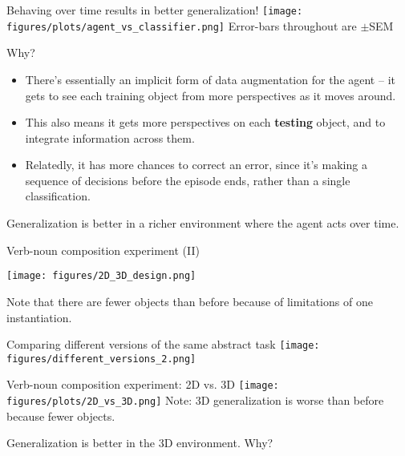 \documentclass{beamer}
\begin{document}
\begin{frame}{Behaving over time results in better generalization!}
\texttt{[image: figures/plots/agent\_vs\_classifier.png]}
{\small Error-bars throughout are \(\pm\)SEM}
\end{frame}

\begin{frame}{Why?}
\begin{itemize}
\item There's essentially an implicit form of data augmentation for the agent -- it gets to see each training object from more perspectives as it moves around.
\item This also means it gets more perspectives on each \textbf{testing} object, and to integrate information across them.
\item Relatedly, it has more chances to correct an error, since it's making a sequence of decisions before the episode ends, rather than a single classification. 
\end{itemize}
\end{frame}

\begin{frame}[standout]
Generalization is better in a richer environment where the agent acts over time.
\end{frame}

\begin{frame}{Verb-noun composition experiment (II)}
\begin{center}
\texttt{[image: figures/2D\_3D\_design.png]}
\end{center}
Note that there are fewer objects than before because of limitations of one instantiation.
\end{frame}

\begin{frame}{Comparing different versions of the same abstract task}
\centering
\texttt{[image: figures/different\_versions\_2.png]}
\end{frame}

\begin{frame}{Verb-noun composition experiment: 2D vs. 3D}
\texttt{[image: figures/plots/2D\_vs\_3D.png]}
{\small Note: 3D generalization is worse than before because fewer objects.}
\end{frame}

\begin{frame}[standout]
Generalization is better in the 3D environment. Why?
\end{frame}
\end{document}
